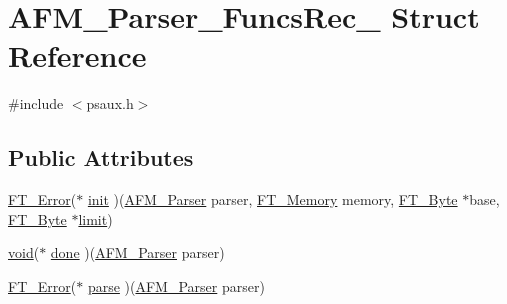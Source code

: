 \hypertarget{struct_a_f_m___parser___funcs_rec__}{\section{A\-F\-M\-\_\-\-Parser\-\_\-\-Funcs\-Rec\-\_\- Struct Reference}
\label{struct_a_f_m___parser___funcs_rec__}
}


{\ttfamily \#include $<$psaux.\-h$>$}

\subsection*{Public Attributes}
\begin{DoxyCompactItemize}
\item 
\hyperlink{fttypes_8h_a64c8060bdb3d6eec844a1bf670e06bdd}{F\-T\-\_\-\-Error}($\ast$ \hyperlink{struct_a_f_m___parser___funcs_rec___a7d5c1422c71ef00984f1207ebfb0b082}{init} )(\hyperlink{psaux_8h_a84b07e707e759851269989f0cafac12b}{A\-F\-M\-\_\-\-Parser} parser, \hyperlink{ftsystem_8h_a67ec7ea35cde99a89a65e9f827a9ad3a}{F\-T\-\_\-\-Memory} memory, \hyperlink{fttypes_8h_a51f26183ca0c9f4af958939648caeccd}{F\-T\-\_\-\-Byte} $\ast$base, \hyperlink{fttypes_8h_a51f26183ca0c9f4af958939648caeccd}{F\-T\-\_\-\-Byte} $\ast$\hyperlink{glew_8h_a702e6dc059ad96a3ec3e24fd769fd6ac}{limit})
\item 
\hyperlink{wglew_8h_aeea6e3dfae3acf232096f57d2d57f084}{void}($\ast$ \hyperlink{struct_a_f_m___parser___funcs_rec___af4e8bc33b14d14b47d13caf0a2449d1b}{done} )(\hyperlink{psaux_8h_a84b07e707e759851269989f0cafac12b}{A\-F\-M\-\_\-\-Parser} parser)
\item 
\hyperlink{fttypes_8h_a64c8060bdb3d6eec844a1bf670e06bdd}{F\-T\-\_\-\-Error}($\ast$ \hyperlink{struct_a_f_m___parser___funcs_rec___a2cd41be89cf12f9227c6f18220cbe2f3}{parse} )(\hyperlink{psaux_8h_a84b07e707e759851269989f0cafac12b}{A\-F\-M\-\_\-\-Parser} parser)
\end{DoxyCompactItemize}


